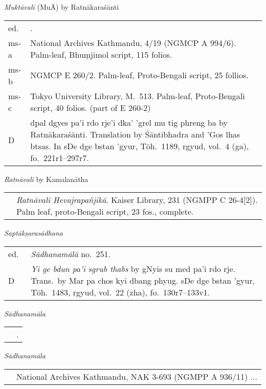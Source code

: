 \documentclass[12pt,twoside]{article}
\newcommand{\mybibexclude}[1]{\addtocategory{fullcited}{#1}}
\begin{document}
\bigskip\noindent\emph{Muktāvalī} (MuĀ) by Ratnākaraśānti\\
\noindent\begin{tabular}{ p{} p{} }
	ed. & \fullcite*{tripathi2001}.\mybibexclude{tripathi2001} \\
	ms-a & National Archives Kathmandu, 4/19 (NGMCP A 994/6). Palm-leaf, Bhuṃjimol script, 115 folios.\\
	ms-b & NGMCP E 260/2. Palm-leaf, Proto-Bengali script, 25 follios. \\
	ms-c & Tokyo University Library, M.\ 513. Palm-leaf, Proto-Bengali script, 40 folios. (part of E 260-2) \\
	D & dpal dgyes pa'i rdo rje'i dka' 'grel mu tig phreng ba by Ratnākaraśānti. Translation by Śāntibhadra and 'Gos lhas btsas. In sDe dge bstan 'gyur, Tōh.\ 1189, rgyud, vol.\ 4 (ga), fo.\ 221r1–297r7. 
\end{tabular}

\bigskip\noindent\emph{Ratnāvalī} by Kamalanātha \\
\noindent\begin{tabular}{ p{} p{} }
	&  \emph{Ratnāvalī Hevajrapañjikā}. Kaiser Library, 231 (NGMPP C 26-4[2]). Palm leaf, proto-Bengali script, 23 fos., complete. 
\end{tabular}

\bigskip\noindent\emph{Saptākṣarasādhana} \\
\noindent\begin{tabular}{ p{} p{} }
	ed.\ & \emph{Sādhanamālā} no.\ 251. \\
	D & \emph{Yi ge bdun pa'i sgrub thabs} by gNyis su med pa'i rdo rje. Trans.\ by Mar pa chos kyi dbang phyug. sDe dge bstan 'gyur, Tōh.\ 1483, rgyud, vol.\ 22 (zha), fo.\ 130r7–133v1. 
\end{tabular}

\bigskip\noindent\emph{Sādhanamāla} \\
\noindent\begin{tabular}{ p{} p{} }
	& \fullcite*{bhattacharyya1925}.\mybibexclude{bhattacharyya1925} 
\end{tabular}

\bigskip\noindent\emph{Sādhanamāla} \\
\noindent\begin{tabular}{ p{} p{} }
	& National Archives Kathmandu, NAK 3-693 (NGMPP A 936/11) ... 
\end{tabular}
\end{document}
